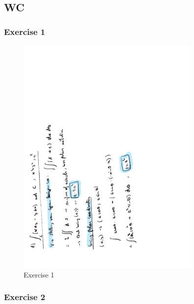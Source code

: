 \documentclass[a4paper]{report}
\begin{document}
\subsection{WC}

\subsubsection{Exercise 1}

\begin{figure}[H]
	\centering
	\includegraphics[angle=-90, width=0.8\textwidth]{assets/wc_7_ex_1.pdf}
	\caption{Exercise 1}
	\label{fig:wc_7_ex_1}
\end{figure}

\subsubsection{Exercise 2}
\end{document}
